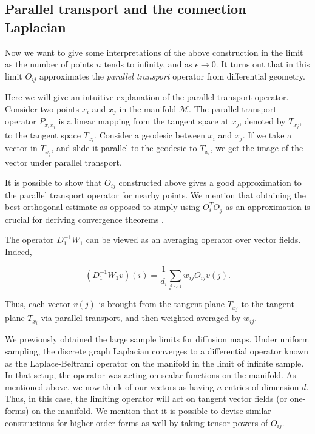 \subsection{Parallel transport and the connection Laplacian}

Now we want to give some interpretations of the above construction in the limit as the number of points $n$ tends to infinity, and as $\epsilon \to 0$. It turns out that in this limit $O_{ij}$ approximates the \emph{parallel transport} operator from differential geometry.

Here we will give an intuitive explanation of the parallel transport operator. Consider two points $x_i$ and $x_j$ in the manifold $\mathcal{M}$. The parallel transport operator $P_{x_ix_j}$ is a linear mapping from the tangent space at $x_j$, denoted by $T_{x_j}$, to the tangent space $T_{x_i}$. Consider a geodesic between $x_i$ and $x_j$. If we take a vector in $T_{x_j}$, and slide it parallel to the geodesic to $T_{x_i}$, we get the image of the vector under parallel transport.

It is possible to show that $O_{ij}$ constructed above gives a good approximation to the parallel transport operator for nearby points. We mention that obtaining the best orthogonal estimate as opposed to simply using $O_i^TO_j$ as an approximation is crucial for deriving convergence theorems \cite{ASinger_HTWu_2011_VDM}. 

The operator $D_1^{-1}W_1$ can be viewed as an averaging operator over vector fields. Indeed,

\[\left(D_1^{-1}W_1 v\right)(i) = \frac{1}{d_i}\sum_{j\sim i} w_{ij}O_{ij}v(j).\]

Thus, each vector $v(j)$ is brought from the tangent plane $T_{x_j}$ to the tangent plane $T_{x_i}$ via parallel transport, and then weighted averaged by $w_{ij}$.

We previously obtained the large sample limits for diffusion maps. Under uniform sampling, the discrete graph Laplacian converges to a differential operator known as the Laplace-Beltrami operator on the manifold in the limit of infinite sample. In that setup, the operator was acting on scalar functions on the manifold. As mentioned above, we now think of our vectors as having $n$ entries of dimension $d$. Thus, in this case, the limiting operator will act on tangent vector fields (or one-forms) on the manifold. We mention that it is possible to devise similar constructions for higher order forms as well by taking tensor powers of $O_{ij}$.

